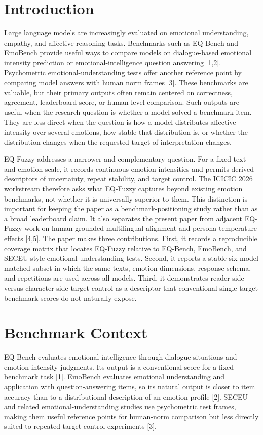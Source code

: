 \documentclass[12pt,a4paper]{icicel}
\begin{document}
\section{Introduction}
Large language models are increasingly evaluated on emotional understanding,
empathy, and affective reasoning tasks.
Benchmarks such as EQ-Bench and EmoBench provide useful ways to compare models
on dialogue-based emotional intensity prediction or emotional-intelligence
question answering [1,2].
Psychometric emotional-understanding tests offer another reference point by
comparing model answers with human norm frames [3].
These benchmarks are valuable, but their primary outputs often remain centered
on correctness, agreement, leaderboard score, or human-level comparison.
Such outputs are useful when the research question is whether a model solved a
benchmark item.
They are less direct when the question is how a model distributes affective
intensity over several emotions, how stable that distribution is, or whether
the distribution changes when the requested target of interpretation changes.

EQ-Fuzzy addresses a narrower and complementary question.
For a fixed text and emotion scale, it records continuous emotion intensities
and permits derived descriptors of uncertainty, repeat stability, and target
control.
The ICICIC 2026 workstream therefore asks what EQ-Fuzzy captures beyond
existing emotion benchmarks, not whether it is universally superior to them.
This distinction is important for keeping the paper as a benchmark-positioning
study rather than as a broad leaderboard claim.
It also separates the present paper from adjacent EQ-Fuzzy work on
human-grounded multilingual alignment and persona-temperature effects [4,5].
The paper makes three contributions.
First, it records a reproducible coverage matrix that locates EQ-Fuzzy relative
to EQ-Bench, EmoBench, and SECEU-style emotional-understanding tests.
Second, it reports a stable six-model matched subset in which the same texts,
emotion dimensions, response schema, and repetitions are used across all
models.
Third, it demonstrates reader-side versus character-side target control as a
descriptor that conventional single-target benchmark scores do not naturally
expose.

\section{Benchmark Context}
EQ-Bench evaluates emotional intelligence through dialogue situations and
emotion-intensity judgments.
Its output is a conventional score for a fixed benchmark task [1].
EmoBench evaluates emotional understanding and application with
question-answering items, so its natural output is closer to item accuracy than
to a distributional description of an emotion profile [2].
SECEU and related emotional-understanding studies use psychometric test
frames, making them useful reference points for human-norm comparison but less
directly suited to repeated target-control experiments [3].
\end{document}
